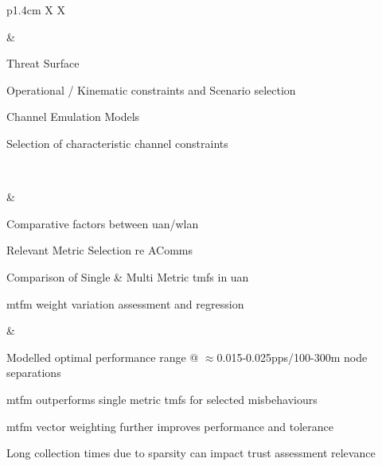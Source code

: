 \begin{table}
{\begin{tabularx}{\textwidth}{p{1.4cm} X X}
\begin{minipage}[t]{\linewidth}
\begin{tightimize}
				\end{tightimize}
			\end{minipage}
			& \begin{minipage}[t]{\linewidth}
				\begin{tightimize} 
					\item Threat Surface
					\item Operational / Kinematic constraints and Scenario selection
					\item Channel Emulation Models
					\item Selection of characteristic channel constraints
				\end{tightimize}
			\end{minipage}\\\midrule
			\begin{minipage}[t][][b]{\linewidth}\end{minipage}
			& \begin{minipage}[t]{\linewidth}
				\begin{tightimize} 
					\item Comparative factors between \gls{uan}/\gls{wlan}
					\item Relevant Metric Selection re AComms
					\item Comparison of Single \& Multi Metric \glspl{tmf} in \gls{uan}
					\item \gls{mtfm} weight variation assessment and regression
				\end{tightimize}
			\end{minipage}
			& \begin{minipage}[t]{\linewidth}
				\begin{tightimize} 
					\item Modelled optimal performance range @ $\approx$0.015-0.025pps/100-300m node separations %
					\item \gls{mtfm} outperforms single metric \glspl{tmf} for selected misbehaviours %
					\item \gls{mtfm} vector weighting further improves performance and tolerance %
					\item Long collection times due to sparsity can impact trust assessment relevance
				\end{tightimize}
			\end{minipage}\\\midrule
			

\end{tabularx}}
\end{table}
